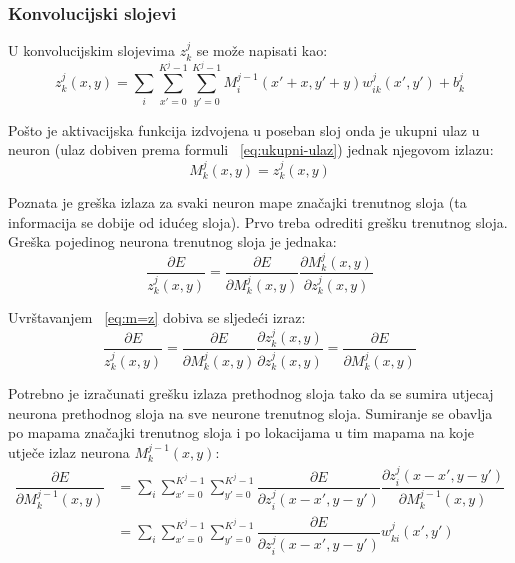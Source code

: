 \documentclass[times, utf8, zavrsni, numeric]{fer}
\begin{document}
\subsubsection{Konvolucijski slojevi}
U konvolucijskim slojevima $z_k^j$ se može napisati kao:
\begin{equation}\label{eq:ukupni-ulaz}
z^j_k (x, y) = \sum_i \sum_{x'=0}^{K^j-1} \sum_{y'=0}^{K^j-1} M^{j-1}_i (x' + x, y' + y) w^j_{ik} (x', y') + b^j_k
\end{equation}

Pošto je aktivacijska funkcija izdvojena u poseban sloj onda je ukupni ulaz u neuron (ulaz dobiven prema formuli ~\ref{eq:ukupni-ulaz}) jednak njegovom izlazu:
\begin{equation}\label{eq:m=z}
M^j_k (x, y) = z^j_k (x, y)
\end{equation}

Poznata je greška izlaza za svaki neuron mape značajki trenutnog sloja (ta informacija se dobije od idućeg sloja). Prvo treba odrediti grešku trenutnog sloja. Greška pojedinog neurona trenutnog sloja je jednaka: 
\begin{equation}
\dfrac{\partial E}{z^j_k (x, y)} = \dfrac{\partial E}{\partial M^j_k (x, y)} \dfrac{\partial M^j_k (x, y)}{\partial z^j_k (x, y)}
\end{equation}

Uvrštavanjem ~\ref{eq:m=z} dobiva se sljedeći izraz:
\begin{equation}
\dfrac{\partial E}{z^j_k (x, y)} = \dfrac{\partial E}{\partial M^j_k (x, y)} \dfrac{\partial z^j_k (x, y)}{\partial z^j_k (x, y)} = \dfrac{\partial E}{\partial M^j_k (x, y)}
\end{equation}

Potrebno je izračunati  grešku izlaza prethodnog sloja tako da se sumira utjecaj neurona prethodnog sloja na sve neurone trenutnog sloja. Sumiranje se obavlja po mapama značajki trenutnog sloja i po lokacijama u tim mapama na koje utječe izlaz neurona $M^{j-1}_k (x, y)$:
\begin{equation}\label{eq:conv-sloj-err}
\begin{split}
\dfrac{\partial E}{\partial M^{j-1}_k (x, y)} &= \sum_i \sum_{x'=0}^{K^j-1} \sum_{y'=0}^{K^j-1} \dfrac{\partial E}{\partial z^j_{i} (x - x',y - y')} \dfrac{\partial z^j_{i} (x - x',y - y')}{\partial M^{j-1}_k (x, y)} \\
 &= \sum_i \sum_{x'=0}^{K^j-1} \sum_{y'=0}^{K^j-1} \dfrac{\partial E}{\partial z^j_{i} (x - x', y - y')} w^j_{ki}(x', y')
\end{split}
\end{equation}
\end{document}
